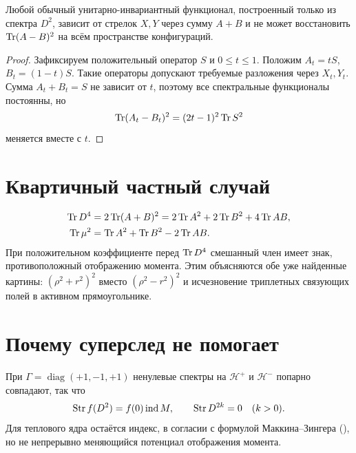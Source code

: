 \begin{theorem}
Любой обычный унитарно-инвариантный функционал, построенный только из
спектра \(D^2\), зависит от стрелок \(X,Y\) через сумму \(A+B\) и не может
восстановить \(\operatorname{Tr}(A-B)^2\) на всём пространстве конфигураций.
\end{theorem}

\begin{proof}
Зафиксируем положительный оператор \(S\) и \(0\le t\le1\). Положим
\(A_t=tS\), \(B_t=(1-t)S\). Такие операторы допускают требуемые разложения
через \(X_t,Y_t\). Сумма \(A_t+B_t=S\) не зависит от \(t\), поэтому все
спектральные функционалы постоянны, но
\begin{equation}
 \operatorname{Tr}(A_t-B_t)^2=(2t-1)^2\operatorname{Tr} S^2
\end{equation}
меняется вместе с \(t\).
\end{proof}

\section{Квартичный частный случай}

\begin{align}
 \operatorname{Tr} D^4&=2\operatorname{Tr}(A+B)^2
 =2\operatorname{Tr} A^2+2\operatorname{Tr} B^2+4\operatorname{Tr} AB,
 \label{eq:v5-positive-cross}\\
 \operatorname{Tr}\mu^2&=\operatorname{Tr} A^2+\operatorname{Tr} B^2-2\operatorname{Tr} AB.
 \label{eq:v5-negative-cross}
\end{align}
При положительном коэффициенте перед \(\operatorname{Tr} D^4\) смешанный член имеет знак,
противоположный отображению момента. Этим объясняются обе уже найденные
картины: \((\rho^2+r^2)^2\) вместо \((\rho^2-r^2)^2\) и исчезновение
триплетных связующих полей в активном прямоугольнике.

\section{Почему суперслед не помогает}

При \(\Gamma=\operatorname{diag}(+1,-1,+1)\) ненулевые спектры на
\(\mathcal H^+\) и \(\mathcal H^-\) попарно совпадают, так что
\begin{equation}
 \operatorname{Str} f(D^2)=f(0)\operatorname{ind}M,
 \qquad \operatorname{Str} D^{2k}=0\quad(k>0).
 \label{eq:v5-supertrace-index}
\end{equation}
Для теплового ядра остаётся индекс, в согласии с формулой Маккина--Зингера
(), но не непрерывно меняющийся потенциал отображения
момента.

